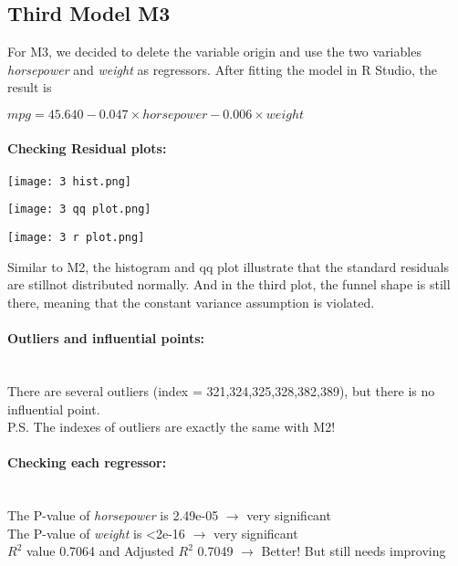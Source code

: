 \documentclass[12pt]{article}
\begin{document}
\subsection{Third Model M3}
For M3, we decided to delete the variable origin and use the two variables \textit{horsepower} and \textit{weight} as regressors.
After fitting the model in R Studio, the result is 
\begin{center}
$ mpg = 45.640 - 0.047 \times horsepower - 0.006 \times weight $
\end{center}
\paragraph{Checking Residual plots:}
\begin{minipage}{\textwidth}
    \begin{minipage}[h]{0.3\linewidth}
        \centering
        \texttt{[image: 3 hist.png]}
        \label{a}
    \end{minipage}
    \begin{minipage}[h]{0.3\linewidth}
        \centering
        \texttt{[image: 3 qq plot.png]}
        \label{b}   
    \end{minipage}
    \begin{minipage}[h]{0.3\linewidth}
        \centering
        \texttt{[image: 3 r plot.png]}
        \label{b}   
    \end{minipage}
\end{minipage}
Similar to M2, the histogram and qq plot illustrate that the standard residuals are stillnot distributed normally. And in the third plot, the funnel shape is still there, meaning that the constant variance assumption is violated.\\ 


\paragraph{Outliers and influential points:}~{}
\\There are several outliers (index = 321,324,325,328,382,389), but there is no influential point.\\
P.S. The indexes of outliers are exactly the same with M2!
\\

\paragraph{Checking each regressor:}~{}\\
The P-value of \textit{horsepower} is 2.49e-05 $\longrightarrow$ very significant\\
The P-value of \textit{weight} is \textless 2e-16 $\longrightarrow$ very significant\\
$R^2$ value 0.7064 and Adjusted $R^2$  0.7049 $\longrightarrow$ Better! But still needs improving
\end{document}
